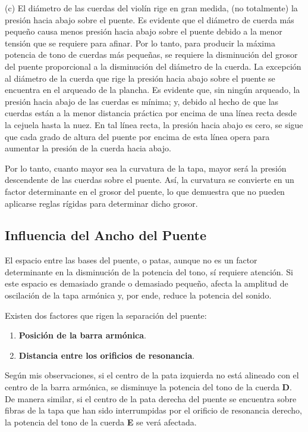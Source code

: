 \documentclass[12pt]{book}
\begin{document}
(c) El diámetro de las cuerdas del violín rige en gran medida, (no totalmente) la presión hacia abajo sobre el puente. Es evidente que el diámetro de cuerda más pequeño causa menos presión hacia abajo sobre el puente debido a la menor tensión que se requiere para afinar. Por lo tanto, para producir la máxima potencia de tono de cuerdas más pequeñas, se requiere la disminución del grosor del puente proporcional a la disminución del diámetro de la cuerda. La excepción al diámetro de la cuerda que rige la presión hacia abajo sobre el puente se encuentra en el arqueado de la plancha. Es evidente que, sin ningún arqueado, la presión hacia abajo de las cuerdas es mínima; y, debido al hecho de que las cuerdas están a la menor distancia práctica por encima de una línea recta desde la cejuela hasta la nuez. En tal línea recta, la presión hacia abajo es cero, se sigue que cada grado de altura del puente por encima de esta línea opera para aumentar la presión de la cuerda hacia abajo.


Por lo tanto, cuanto mayor sea la curvatura de la tapa, mayor será la presión descendente de las cuerdas sobre el puente. Así, la curvatura se convierte en un factor determinante en el grosor del puente, lo que demuestra que no pueden aplicarse reglas rígidas para determinar dicho grosor.

\subsection*{Influencia del Ancho del Puente}

El espacio entre las bases del puente, o patas, aunque no es un factor determinante en la disminución de la potencia del tono, sí requiere atención. Si este espacio es demasiado grande o demasiado pequeño, afecta la amplitud de oscilación de la tapa armónica y, por ende, reduce la potencia del sonido.

Existen dos factores que rigen la separación del puente:
\begin{enumerate}
    \item \textbf{Posición de la barra armónica}.
    \item \textbf{Distancia entre los orificios de resonancia}.
\end{enumerate}

Según mis observaciones, si el centro de la pata izquierda no está alineado con el centro de la barra armónica, se disminuye la potencia del tono de la cuerda \textbf{D}. De manera similar, si el centro de la pata derecha del puente se encuentra sobre fibras de la tapa que han sido interrumpidas por el orificio de resonancia derecho, la potencia del tono de la cuerda \textbf{E} se verá afectada.
\end{document}
